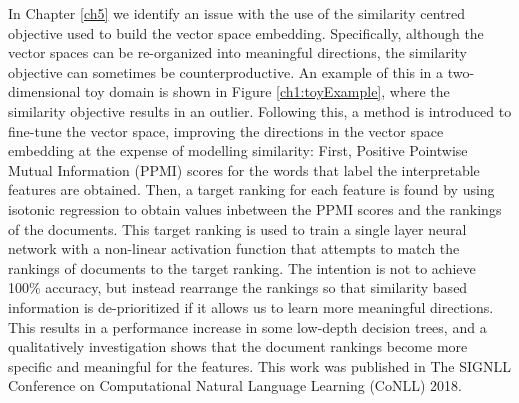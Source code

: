In Chapter \ref{ch5} we identify an issue with the use of the similarity centred objective used to build the vector space embedding. Specifically, although the vector spaces can be re-organized into meaningful directions, the similarity objective can sometimes be counterproductive. An example of this in a two-dimensional toy domain is shown in Figure \ref{ch1:toyExample}, where the similarity objective results in an outlier. Following this, a method is introduced to fine-tune the vector space, improving the directions in the vector space embedding at the expense of modelling similarity: First, Positive Pointwise Mutual Information (PPMI) scores for the words that label the interpretable features are obtained. Then, a target ranking for each feature is found by using isotonic regression to obtain values inbetween the PPMI scores and the rankings of the documents. This target ranking is used to train a single layer neural network with a non-linear activation function that attempts to match the rankings of documents to the target ranking. The intention is not to achieve 100\% accuracy, but instead rearrange the rankings so that similarity based information is de-prioritized if it allows us to learn more meaningful directions. This results in a performance increase in some low-depth decision trees,  and a qualitatively investigation shows that the document rankings become more specific and meaningful for the features. This work was published in The SIGNLL Conference on Computational Natural Language Learning (CoNLL) 2018.






